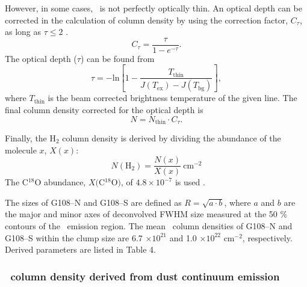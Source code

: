 \documentclass[manuscript]{aastex}
\begin{document}
However, in some cases, \ceot\ is not perfectly optically thin.
An optical depth can be corrected in the calculation of column density by using the correction factor, $C_{\tau}$, as long as $\tau \leq 2$ \citep{schnee07}.
\begin{equation}
C_{\tau}=\frac{\tau}{1-e^{-\tau}}.
\end{equation}
The optical depth ($\tau$) can be found from
\begin{equation}
\tau = -\textrm{ln}\left[1-\frac{T_{\textrm{thin}}}{J(T_{\textrm{ex}})-J(T_{\textrm{bg}})}\right],
\end{equation}
where $T_{\textrm{thin}}$ is the beam corrected brightness temperature of the given line.
The final column density corrected for the optical depth is
\begin{equation}
N=N_{\textrm{thin}} \cdot C_{\tau}.
\end{equation}


Finally, the H$_2$ column density is derived by dividing the abundance of the molecule $x$, $X(x)$:
\begin{equation}
N (\textrm{H$_2$}) = \frac{N(x)}{X(x)} \ \textrm{cm}^{-2}
\end{equation}
The C$^{18}$O abundance, $X(\textrm{C$^{18}$O)}$, of $4.8\times 10^{-7}$ is used \citep{lee03}.


The sizes of G108--N and G108--S are defined as $R=\sqrt{a\cdot b}$, where $a$ and $b$ are the major and minor axes of deconvolved FWHM size measured at the 50 $\%$ contours of the \ceot\ emission region.
The mean \atomh\ column densities of G108--N and G108--S within the clump size are 6.7 $\times 10^{21}$ and 1.0 $\times 10^{22}$ cm$^{-2}$, respectively.
Derived parameters are listed in Table 4.

\subsubsection{\atomh\ column density derived from dust continuum emission}
\end{document}
